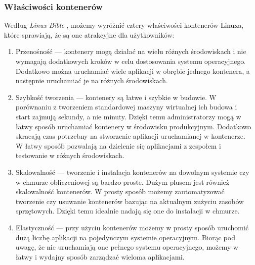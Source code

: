 \documentclass[12pt]{report}
\let\Oldsubsubsection\subsubsection
\renewcommand{\subsubsection}{\FloatBarrier\Oldsubsubsection}
\begin{document}
\subsubsection{Właściwości kontenerów}
Według \textit{Linux Bible} \cite{linux}, możemy wyróżnić cztery właściwości kontenerów Linuxa, które sprawiają, że są one atrakcyjne dla użytkowników:

\begin{enumerate}
\item Przenośność --- kontenery mogą działać na wielu różnych środowiskach i nie wymagają dodatkowych kroków w celu dostosowania systemu operacyjnego. Dodatkowo można uruchamiać wiele aplikacji w obrębie jednego kontenera, a następnie uruchamiać je na różnych środowiskach.

\item Szybkość tworzenia --- kontenery są łatwe i szybkie w budowie. W porównaniu z tworzeniem standardowej maszyny wirtualnej ich budowa i start zajmują sekundy, a nie minuty. Dzięki temu administratorzy mogą w łatwy sposób uruchamiać kontenery w środowisku produkcyjnym. Dodatkowo skracają czas potrzebny na stworzenie aplikacji uruchamianej w kontenerze. W łatwy sposób pozwalają na dzielenie się aplikacjami z zespołem i testowanie w różnych środowiskach.

\item Skalowalność --- tworzenie i instalacja kontenerów na dowolnym systemie czy w chmurze obliczeniowej są bardzo proste. Dużym plusem jest również skalowalność kontenerów. W prosty sposób możemy zautomatyzować tworzenie czy usuwanie kontenerów bazując na aktualnym zużyciu zasobów sprzętowych. Dzięki temu idealnie nadają się one do instalacji w chmurze.

\item Elastyczność --- przy użyciu kontenerów możemy w prosty sposób uruchomić dużą liczbę aplikacji na pojedynczym systemie operacyjnym. Biorąc pod uwagę, że nie uruchamiają one pełnego systemu operacyjnego, możemy w łatwy i wydajny sposób zarządzać wieloma aplikacjami. 
\end{enumerate}
\end{document}
